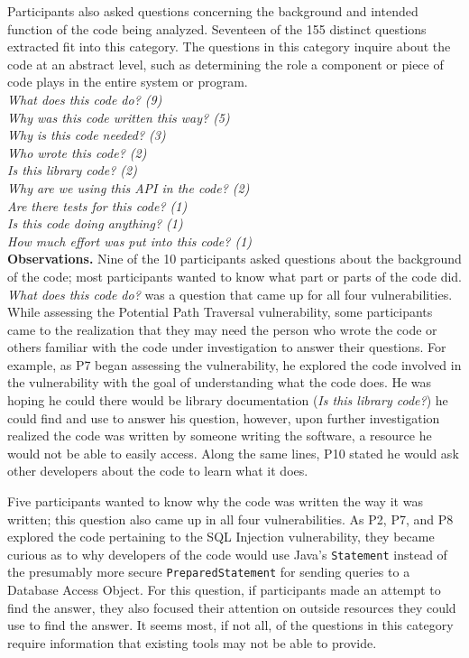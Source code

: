\documentclass[conference]{IEEEtran}
\begin{document}
Participants also asked questions concerning the background and intended function of the code being analyzed. 
Seventeen of the 155 distinct questions extracted fit into this category. 
The questions in this category inquire about the code at an abstract level, such as determining the role a component or piece of code plays in the entire system or program.
\\

\noindent\emph{What does this code do? (9)} \\
\emph{Why was this code written this way? (5)} \\
\emph{Why is this code needed? (3)} \\
\emph{Who wrote this code? (2)} \\
\emph{Is this library code? (2)} \\
\emph{Why are we using this API in the code? (2)} \\
\emph{Are there tests for this code? (1)} \\
\emph{Is this code doing anything? (1)} \\
\emph{How much effort was put into this code? (1)} \\



\noindent\textbf{Observations.}
Nine of the 10 participants asked questions about the background of the code; most participants wanted to know what part or parts of the code did.
\textit{What does this code do?} was a question that came up for all four vulnerabilities. 
While assessing the Potential Path Traversal vulnerability, some participants came to the realization that they may need the person who wrote the code or others familiar with the code under investigation to answer their questions. 
For example, as P7 began assessing the vulnerability, he explored the code involved in the vulnerability with the goal of understanding what the code does. 
He was hoping he could there would be library documentation (\textit{Is this library code?}) he could find and use to answer his question, however, upon further investigation realized the code was written by someone writing the software, a resource he would not be able to easily access.
Along the same lines, P10 stated he would ask other developers about the code to learn what it does.

Five participants wanted to know why the code was written the way it was written; this question also came up in all four vulnerabilities.
As P2, P7, and P8 explored the code pertaining to the SQL Injection vulnerability, they became curious as to why developers of the code would use Java's \texttt{Statement} instead of the presumably more secure \texttt{PreparedStatement} for sending queries to a Database Access Object.
For this question, if participants made an attempt to find the answer, they also focused their attention on outside resources they could use to find the answer. 
It seems most, if not all, of the questions in this category require information that existing tools may not be able to provide.
\\
\end{document}

